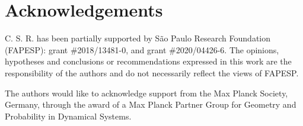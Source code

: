 \documentclass[11pt,reqno]{amsart}
\theoremstyle{plain}
\theoremstyle{definition}
\begin{document}
\section*{Acknowledgements}
		

C. S. R. has been partially supported by S\~{a}o Paulo Research Foundation (FAPESP): grant \#2018/13481-0, and grant \#2020/04426-6. The opinions, hypotheses and conclusions or recommendations expressed in this work are the responsibility of the authors and do not necessarily reflect the views of FAPESP.

The authors would like to acknowledge support from the Max Planck Society, Germany, through the award of a Max Planck Partner Group for Geometry and Probability in Dynamical Systems.\\



\end{document}
